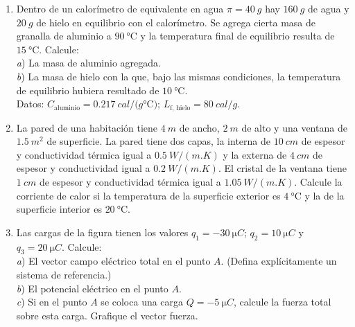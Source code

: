 \documentclass[a4paper,11pt,dvipsnames, twocolumn]{article}
\begin{document}
\begin{enumerate}[wide, labelwidth=2pt, labelindent=0pt]


\item Dentro de un calorímetro de equivalente en agua $\pi = \SI{40}{g}$ hay $\SI{160}{g}$ de agua y $\SI{20}{g}$ de hielo en equilibrio con el calorímetro. Se agrega cierta masa de granalla de aluminio a $\SI{90}{\celsius}$ y la temperatura final de equilibrio resulta de $\SI{15}{\celsius}$. Calcule:\\
\textit{a}) La masa de aluminio agregada.\\
\textit{b}) La masa de hielo con la que, bajo las mismas condiciones, la temperatura de equilibrio hubiera resultado de $\SI{10}{\celsius}$.\\
Datos: $C_\text{aluminio} = \SI{0.217}{cal/(g \celsius)}$; $L_\text{f, hielo} = \SI{80}{cal/g}$. 

\item La pared de una habitación tiene $\SI{4}{m}$ de ancho, $\SI{2}{m}$ de alto y una ventana de $\SI{1.5}{m^2}$ de superficie. La pared tiene dos capas, la interna de $\SI{10}{cm}$ de espesor y conductividad térmica igual a $\SI{0.5}{W/(m . K)}$ y la externa de $\SI{4}{cm}$ de espesor y conductividad igual a $\SI{0.2}{W/(m . K)}$. El cristal de la ventana tiene $\SI{1}{cm}$ de espesor y conductividad térmica igual a $\SI{1.05}{W/(m . K)}$.  Calcule la corriente de calor si la temperatura de la superficie exterior es $\SI{4}{\celsius}$ y la de la superficie interior es $\SI{20}{\celsius}$.


\item Las cargas de la figura tienen los valores $q_1 = \SI{-30}{\micro C}$; $q_2 = \SI{10}{\micro C}$ y $q_3 = \SI{20}{\micro C}$. Calcule:\\
\textit{a}) El vector campo eléctrico total en el punto $A$. (Defina explícitamente un sistema de referencia.)\\
\textit{b}) El potencial eléctrico en el punto $A$.\\
\textit{c}) Si en el punto $A$ se coloca una carga $Q = \SI{-5}{\micro C}$, calcule la fuerza total sobre esta carga. Grafique el vector fuerza.

\begin{center}
\end{center}


\end{enumerate}
\end{document}
